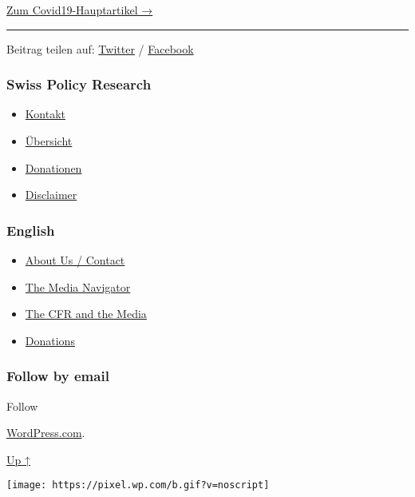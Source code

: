 \href{https://swprs.org/covid-19-hinweis-ii/}{Zum Covid19-Hauptartikel
→}

\begin{center}\rule{0.5\linewidth}{\linethickness}\end{center}

Beitrag teilen auf:
\href{https://twitter.com/intent/tweet?url=https://swprs.org/corona-medien-propaganda/}{Twitter}
/
\href{https://www.facebook.com/share.php?u=https://swprs.org/corona-medien-propaganda/}{Facebook}

\hypertarget{swiss-policy-research}{%
\subsubsection{Swiss Policy Research}\label{swiss-policy-research}}

\begin{itemize}
\tightlist
\item
  \href{https://swprs.org/kontakt/}{Kontakt}
\item
  \href{https://swprs.org/uebersicht/}{Übersicht}
\item
  \href{https://swprs.org/donationen/}{Donationen}
\item
  \href{https://swprs.org/disclaimer/}{Disclaimer}
\end{itemize}

\hypertarget{english}{%
\subsubsection{English}\label{english}}

\begin{itemize}
\tightlist
\item
  \href{https://swprs.org/contact/}{About Us / Contact}
\item
  \href{https://swprs.org/media-navigator/}{The Media Navigator}
\item
  \href{https://swprs.org/the-american-empire-and-its-media/}{The CFR
  and the Media}
\item
  \href{https://swprs.org/donations/}{Donations}
\end{itemize}

\hypertarget{follow-by-email}{%
\subsubsection{Follow by email}\label{follow-by-email}}

Follow

\href{https://wordpress.com/?ref=footer_custom_com}{WordPress.com}.

\protect\hyperlink{}{Up ↑}

\texttt{[image: https://pixel.wp.com/b.gif?v=noscript]}
